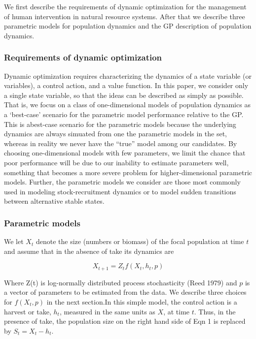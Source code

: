\documentclass[]{components/elsarticle}
\begin{document}
We first describe the requirements of dynamic optimization for the
management of human intervention in natural resource systems. After that
we describe three parametric models for population dynamics and the GP
description of population dynamics.

\subsubsection{Requirements of dynamic
optimization}\label{requirements-of-dynamic-optimization}

Dynamic optimization requires characterizing the dynamics of a state
variable (or variables), a control action, and a value function. In this
paper, we consider only a single state variable, so that the ideas can
be described as simply as possible. That is, we focus on a class of
one-dimensional models of population dynamics as a `best-case' scenario
for the parametric model performance relative to the GP. This is
abest-case scenario for the parametric models because the underlying
dynamics are always simuated from one the parametric models in the set,
whereas in reality we never have the ``true'' model among our
candidates. By choosing one-dimensional models with few parameters, we
limit the chance that poor performance will be due to our inability to
estimate parameters well, something that becomes a more severe problem
for higher-dimensional parametric models. Further, the parametric models
we consider are those most commonly used in modeling stock-recruitment
dynamics or to model sudden transitions between alternative stable
states.

\subsubsection{Parametric models}\label{parametric-models}

We let $X_t$ denote the size (numbers or biomass) of the focal
population at time $t$ and assume that in the absence of take its
dynamics are

\[ X_{t+1}= Z_t f(X_t, h_t, p) \]

Where Z(t) is log-normally distributed process stochasticity (Reed 1979)
and $p$ is a vector of parameters to be estimated from the data. We
describe three choices for $f(X_t,p)$ in the next section.In this simple
model, the control action is a harvest or take, $h_t$, measured in the
same units as $X$, at time $t$. Thus, in the presence of take, the
population size on the right hand side of Eqn 1 is replaced by
$S_t=X_t-h_t$.
\end{document}
